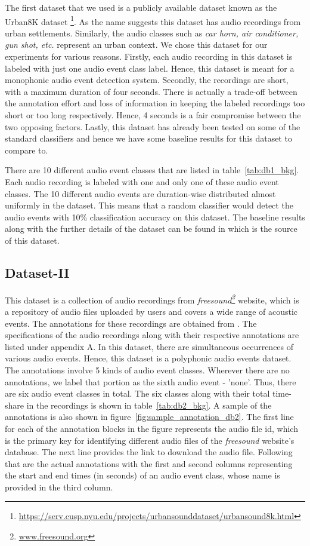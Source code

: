 The first dataset that we used is a publicly available dataset known as the Urban8K dataset \footnote{\url{https://serv.cusp.nyu.edu/projects/urbansounddataset/urbansound8k.html}}. As the name suggests this dataset has audio recordings from urban settlements. Similarly, the audio classes such as \textsl{car horn, air conditioner, gun shot, etc.} represent an urban context. We chose this dataset for our experiments for various reasons. Firstly, each audio recording in this dataset is labeled with just one audio event class label. Hence, this dataset is meant for a monophonic audio event detection system. Secondly, the recordings are short, with a maximum duration of four seconds. There is actually a trade-off between the annotation effort and loss of information in keeping the labeled recordings too short or too long respectively. Hence, 4 seconds is a fair compromise between the two opposing factors. Lastly, this dataset has already been tested on some of the standard classifiers and hence we have some baseline results for this dataset to compare to. 

There are 10 different audio event classes that are listed in table~\ref{tab:db1_bkg}. Each audio recording is labeled with one and only one of these audio event classes. The 10 different audio events are duration-wise distributed almost uniformly in the dataset. This means that a random classifier would detect the audio events with 10\% classification accuracy on this dataset. The baseline results along with the further details of the dataset can be found in \cite{salamon2014dataset} which is the source of this dataset. 

\subsection{Dataset-II}

This dataset is a collection of audio recordings from \textsl{freesound\footnote{\url{www.freesound.org}}} website, which is a repository of audio files uploaded by users and covers a wide range of acoustic events. The annotations for these recordings are obtained from \cite{kons2013audio}. The specifications of the audio recordings along with their respective annotations are listed under appendix A. In this dataset, there are simultaneous occurrences of various audio events. Hence, this dataset is a polyphonic audio events dataset. The annotations involve 5 kinds of audio event classes. Wherever there are no annotations, we label that portion as the sixth audio event - 'none'. Thus, there are six audio event classes in total. The six classes along with their total time-share in the recordings is shown in table~\ref{tab:db2_bkg}. A sample of the annotations is also shown in figure~\ref{fig:sample_annotation_db2}. The first line for each of the annotation blocks in the figure represents the audio file id, which is the primary key for identifying different audio files of the \textsl{freesound} website's database. The next line provides the link to download the audio file. Following that are the actual annotations with the first and second columns representing the start and end times (in seconds) of an audio event class, whose name is provided in the third column.

